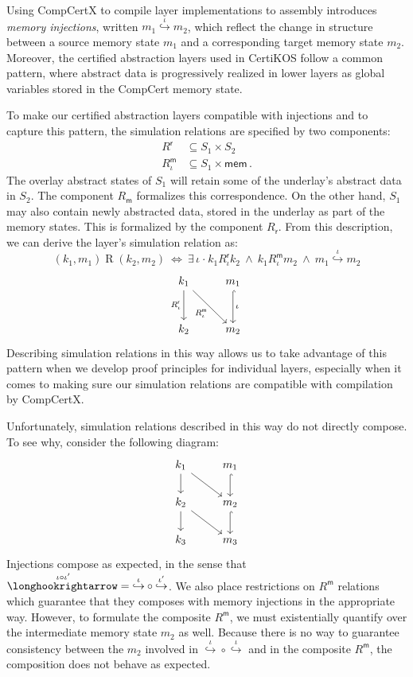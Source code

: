 \documentclass[11pt,oneside,draft]{book}
\theoremstyle{definition}
\newcommand{\kw}[1]{\ensuremath{ \mathsf{#1} }}
\newcommand{\bdot}{\boldsymbol{\cdot}}
\begin{document}
Using CompCertX to compile layer implementations
to assembly
introduces \emph{memory injections},
written $m_1 \stackrel{\iota}{\hookrightarrow} m_2$,
which reflect the change in structure
between a source memory state $m_1$
and a corresponding target memory state $m_2$.
Moreover,
the certified abstraction layers used in CertiKOS
follow a common pattern,
where abstract data is progressively
realized in lower layers
as global variables stored in the CompCert memory state.

To make our certified abstraction layers compatible
with injections and to capture this pattern,
the simulation relations are specified by two components:
\begin{align*}
  R^\kw{r} &\subseteq S_1 \times S_2 \\
  R^\kw{m}_\iota &\subseteq S_1 \times \kw{mem}
  \,.
\end{align*}
The overlay abstract states of $S_1$
will retain some of the underlay's abstract data in $S_2$.
The component $R_\kw{m}$ formalizes this correspondence.
On the other hand,
$S_1$ may also contain newly abstracted data,
stored in the underlay as part of the memory states.
This is formalized by the component $R_\kw{r}$.
From this description,
we can derive the layer's simulation relation
as:
\[
  (k_1, m_1) \mathrel{R} (k_2, m_2)
  \: \Leftrightarrow \:
  \exists \, \iota \:\bdot\:
    k_1 \mathrel{R^\kw{r}_\iota} k_2 \:\wedge\:
    k_1 \mathrel{R^\kw{m}_\iota} m_2 \:\wedge\:
    m_1 \stackrel{\iota}{\hookrightarrow} m_2
\]
\[
  \begin{tikzcd}[row sep=large]
    k_1 \ar[d, "R^\kw{r}_\iota"']
        \ar[dr, "R^\kw{m}_\iota"'] &
    m_1 \ar[d, hook, "\iota"] \\
    k_2 & m_2
  \end{tikzcd}
\]
Describing simulation relations in this way
allows us to take advantage of this pattern
when we develop proof principles for
individual layers,
especially when it comes to
making sure our simulation
relations are compatible with
compilation by CompCertX.

Unfortunately,
simulation relations described in this way
do not directly compose.
To see why,
consider the following diagram:
\[
  \begin{tikzcd}
    k_1 \ar[d] \ar[dr] & m_1 \ar[d, hook] \\
    k_2 \ar[d] \ar[dr] & m_2 \ar[d, hook] \\
    k_3 & m_3
  \end{tikzcd}
\]
Injections compose as expected,
in the sense that
${\stackrel{\: \iota \circ \iota'}{\longhookrightarrow}} =
 {\stackrel{\iota}{\hookrightarrow}} \circ
 {\stackrel{\iota'}{\hookrightarrow}}$.
We also place restrictions on $R^\kw{m}$
relations
which guarantee that they composes with memory injections
in the appropriate way.
However,
to formulate the composite $R^\kw{m}$,
we must existentially quantify
over the intermediate memory state $m_2$ as well.
Because there is no way to guarantee consistency between
the $m_2$ involved in
$\stackrel{\iota}{\hookrightarrow} \circ
 \stackrel{\iota}{\hookrightarrow}$
and in the composite $R^\kw{m}$,
the composition does not behave as expected.
\end{document}
